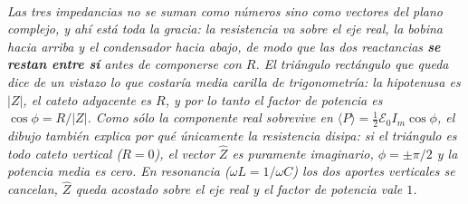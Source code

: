 \begin{center}
\\[0.5em]
{\small\itshape Las tres impedancias no se suman como números sino como
vectores del plano complejo, y ahí está toda la gracia: la resistencia va sobre
el eje real, la bobina hacia arriba y el condensador hacia abajo, de modo que
las dos reactancias \textbf{se restan entre sí} antes de componerse con $R$. El
triángulo rectángulo que queda dice de un vistazo lo que costaría media carilla
de trigonometría: la hipotenusa es $|Z|$, el cateto adyacente es $R$, y por lo
tanto el factor de potencia es $\cos\phi = R/|Z|$. Como sólo la componente
\emph{real} sobrevive en $\langle P\rangle = \tfrac12\mathcal{E}_0 I_m\cos\phi$,
el dibujo también explica por qué únicamente la resistencia disipa: si el
triángulo es todo cateto vertical ($R = 0$), el vector $\hat Z$ es puramente
imaginario, $\phi = \pm\pi/2$ y la potencia media es cero. En resonancia
($\omega L = 1/\omega C$) los dos aportes verticales se cancelan, $\hat Z$
queda acostado sobre el eje real y el factor de potencia vale $1$.}
\end{center}
